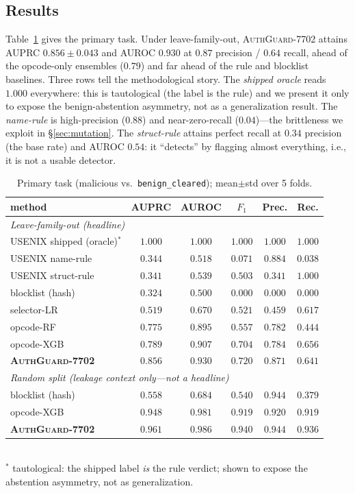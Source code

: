 \documentclass[conference]{IEEEtran}
\newcommand{\tool}{\textsc{AuthGuard-7702}}
\newcommand{\code}[1]{\texttt{#1}}
\begin{document}
\subsection{Results}
Table~\ref{tab:detection} gives the primary task. Under leave-family-out, \tool{} attains
AUPRC $0.856\pm0.043$ and AUROC $0.930$ at $0.87$ precision / $0.64$ recall, ahead of the
opcode-only ensembles ($0.79$) and far ahead of the rule and blocklist baselines. Three rows
tell the methodological story. The \emph{shipped oracle} reads $1.000$ everywhere: this is
tautological (the label is the rule) and we present it only to expose the benign-abstention
asymmetry, not as a generalization result. The \emph{name-rule} is high-precision ($0.88$) and
near-zero-recall ($0.04$)---the brittleness we exploit in \S\ref{sec:mutation}. The
\emph{struct-rule} attains perfect recall at $0.34$ precision (the base rate) and AUROC
$0.54$: it ``detects'' by flagging almost everything, i.e., it is not a usable detector.

\begin{table}[t]
\centering
\caption{Primary task (malicious vs.\ \code{benign\_cleared}); mean$\pm$std over 5 folds.}
\label{tab:detection}
\setlength{\tabcolsep}{4pt}
\begin{tabular}{lccccc}
\toprule
method & AUPRC & AUROC & $F_1$ & Prec. & Rec. \\
\midrule
\multicolumn{6}{l}{\emph{Leave-family-out (headline)}}\\
USENIX shipped (oracle)$^\ast$ & $1.000$ & $1.000$ & $1.000$ & $1.000$ & $1.000$ \\
USENIX name-rule    & $0.344$ & $0.518$ & $0.071$ & $0.884$ & $0.038$ \\
USENIX struct-rule  & $0.341$ & $0.539$ & $0.503$ & $0.341$ & $1.000$ \\
blocklist (hash)    & $0.324$ & $0.500$ & $0.000$ & $0.000$ & $0.000$ \\
selector-LR         & $0.519$ & $0.670$ & $0.521$ & $0.459$ & $0.617$ \\
opcode-RF           & $0.775$ & $0.895$ & $0.557$ & $0.782$ & $0.444$ \\
opcode-XGB          & $0.789$ & $0.907$ & $0.704$ & $0.784$ & $0.656$ \\
\textbf{\tool{}}    & $\mathbf{0.856}$ & $\mathbf{0.930}$ & $\mathbf{0.720}$ & $\mathbf{0.871}$ & $0.641$ \\
\midrule
\multicolumn{6}{l}{\emph{Random split (leakage context only---not a headline)}}\\
blocklist (hash)    & $0.558$ & $0.684$ & $0.540$ & $0.944$ & $0.379$ \\
opcode-XGB          & $0.948$ & $0.981$ & $0.919$ & $0.920$ & $0.919$ \\
\textbf{\tool{}}    & $0.961$ & $0.986$ & $0.940$ & $0.944$ & $0.936$ \\
\bottomrule
\end{tabular}
\\[2pt]
\footnotesize $^\ast$ tautological: the shipped label \emph{is} the rule verdict; shown to
expose the abstention asymmetry, not as generalization.
\end{table}
\end{document}
